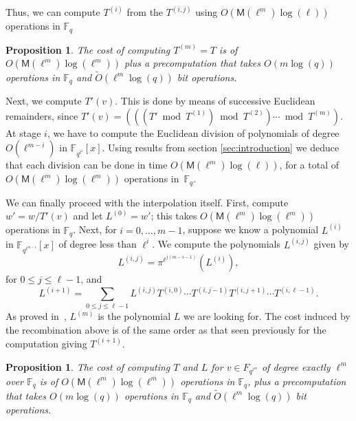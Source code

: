 \documentclass{lms}
\newcommand{\todo}[1]{{\color{red}TODO: #1}}
\newtheorem{prop}[thm]{Proposition}
\newcommand{\F}{\mathbb{F}}
\begin{document}
Thus, we can compute $T^{(i)}$ from the $T^{(i,j)}$ using $O(\mathsf{M}(\ell^m)\log(\ell))$
operations in $\F_q$

\begin{prop}
The cost of computing $T^{(m)}=T$ is of $O(\mathsf{M}(\ell^m)\log(\ell^m))$ plus a precomputation that takes $O(m \log(q))$ operations in $\F_q$ and
$\tilde{O}(\ell^{m} \log(q))$ bit operations.
\end{prop}

Next, we compute $T'(v)$. This is done by means of successive
Euclidean remainders, since $T'(v) = (((T' \bmod T^{(1)}) \bmod
T^{(2)}) \cdots \bmod T^{(m)})$.  At stage $i$, we have to compute 
the Euclidean division of polynomials of degree $O(\ell^{m-i})$ 
in $\F_{q^{\ell^i}}[x]$. Using %
results from section \ref{sec:introduction}
we deduce that each division can be done in time
$O(\mathsf{M}(\ell^m)\log(\ell))$, for a total of 
$O(\mathsf{M}(\ell^m)\log(\ell^m))$ operations in~$\F_q$.

We can finally proceed with the interpolation itself. First, compute
$w' = w/T'(v)$ and let $L^{(0)}=w'$; this takes $O(\mathsf{M}(\ell^m)\log(\ell^m))$ operations in $\F_q$.
Next, for $i=0,\dots,m-1$, suppose we
know a polynomial $L^{(i)}$ in $\F_{q^{\ell^{m-i}}}[x]$
 of degree less than
$\ell^i$. We compute the polynomials $L^{(i,j)}$ given by
$$L^{(i,j)}= \pi^{\ell^{j(m-i-1)}}\left (L^{(i)} \right),$$
for $0 \le j \le \ell-1$, 
and 
$$L^{(i+1)} = \sum_{0 \le j \le \ell-1} L^{(i,j)} T^{(i,0)} \cdots
T^{(i,j-1)} T^{(i,j+1)} \cdots T^{(i,\ell-1)}.$$ As proved
in~\cite{df10}, $L^{(m)}$ is the polynomial $L$ we are looking for.
The cost induced by the recombination above is of the same order as
that seen previously for the computation giving
$T^{(i+1)}$.%
\begin{prop}
The cost of computing $T$ and $L$ for $v \in F_{q^{\ell^m}}$ of degree exactly $\ell^{m}$ over $\mathbb{F}_q$ is of $O(\mathsf{M}(\ell^m)
\log(\ell^m))$ operations in $\F_q$, plus a precomputation that takes
$O(m \log(q))$ operations in $\F_q$ and $\tilde{O}(\ell^{m} \log(q))$
bit operations.
\end{prop}
\end{document}
